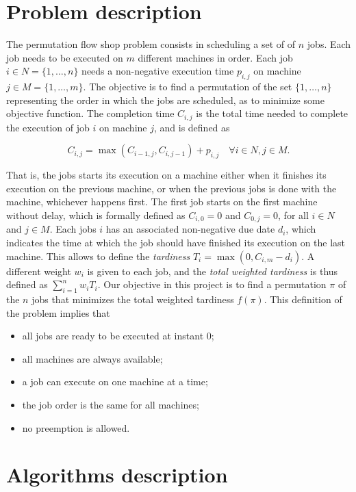 \documentclass[runningheads]{llncs}
\begin{document}
\section{Problem description}
\label{sec:prob}

The permutation flow shop problem consists in scheduling a set of of $n$ jobs.
Each job needs to be executed on $m$ different machines in order. Each job
$i\in N = \{1,\dots,n\}$ needs a non-negative execution time $p_{i,j}$ on machine
$j\in M = \{1,\dots, m\}$. The objective is to find a permutation of the set
$\{1,\dots,n\}$ representing the order in which the jobs are scheduled, as to
minimize some objective function. The completion time $C_{i,j}$ is the total
time needed to complete the execution of job $i$ on machine $j$, and is defined
as

\begin{equation}
	C_{i,j}=\max(C_{i-1,j}, C_{i, j-1}) + p_{i,j}\quad\forall i\in N,j\in M.
\end{equation}

That is, the jobs starts its execution on a machine either when it finishes its
execution on the previous machine, or when the previous jobs is done with the
machine, whichever happens first. The first job starts on the first machine
without delay, which is formally defined as $C_{i, 0} = 0$ and $C_{0, j} = 0$,
for all $i\in N$ and $j\in M$. Each jobs $i$ has an associated non-negative due
date $d_i$, which indicates the time at which the job should have finished its
execution on the last machine. This allows to define the \emph{tardiness}
$T_i=\max(0, C_{i, m} - d_i)$. A different weight $w_i$ is given to each job,
and the \emph{total weighted tardiness} is thus defined as $\sum_{i=1}^n
w_iT_i$. Our objective in this project is to find a permutation $\pi$ of the $n$
jobs that minimizes the total weighted tardiness $f(\pi)$. This definition of
the problem implies that

\begin{itemize}
	\item all jobs are ready to be executed at instant 0;
	\item all machines are always available;
	\item a job can execute on one machine at a time;
	\item the job order is the same for all machines;
	\item no preemption is allowed.
\end{itemize}


\section{Algorithms description}
\label{sec:algo}
\end{document}
